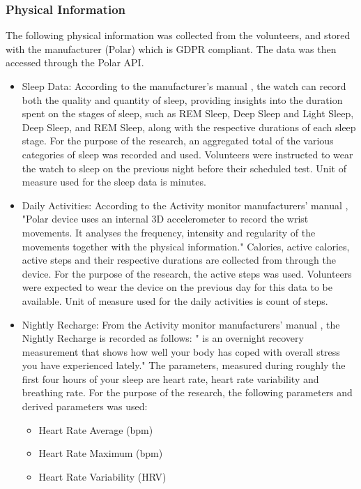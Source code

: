 \subsubsection*{Physical Information}

The following physical information was collected from the volunteers, and stored with the manufacturer (Polar) which is GDPR compliant. The data was then accessed through the Polar API.

\begin{itemize}
    \item Sleep Data: According to the manufacturer's manual \cite{polarManual}, the watch can record both the quality and quantity of sleep, providing insights into
    the duration spent on the stages of sleep, such as REM Sleep, Deep Sleep and Light Sleep, Deep Sleep, and REM Sleep, along with the respective durations of each sleep stage. For the purpose of the research, an aggregated total of the various categories of sleep was 
    recorded and used.
    Volunteers were instructed to wear the watch to sleep on the previous night before their scheduled test. Unit of measure used for the sleep data is minutes. 
    \item Daily Activities: According to the Activity monitor manufacturers' manual \cite{polarManual}, "Polar device uses an internal 3D accelerometer to record the wrist movements. It analyses the frequency, 
    intensity and regularity of the movements together with the physical information." Calories, active calories, active steps and their respective durations are collected from through the device. For the 
    purpose of the research, the active steps was used. Volunteers were expected to wear the device on the previous day for this data to be available. Unit of measure used for the daily activities is count of steps.
    \item Nightly Recharge: From the Activity monitor manufacturers' manual \cite{polarManual}, the Nightly Recharge is recorded as follows: " is an overnight recovery measurement that shows how well your body has
    coped with overall stress you have experienced lately." The parameters, measured during roughly the first four hours of your sleep are heart rate, heart rate variability and breathing rate. For the purpose 
    of the research, the following parameters and derived parameters was used:
    \begin{itemize}
        \item Heart Rate Average (bpm)
        \item Heart Rate Maximum (bpm)
        \item Heart Rate Variability (HRV)
    \end{itemize}
\end{itemize}

